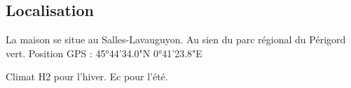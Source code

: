 \subsection{Localisation}

La maison se situe au Salles-Lavauguyon. Au sien du parc régional du Périgord vert.
Position GPS : 45°44'34.0"N 0°41'23.8"E

Climat H2 pour l'hiver. Ec pour l'été.
